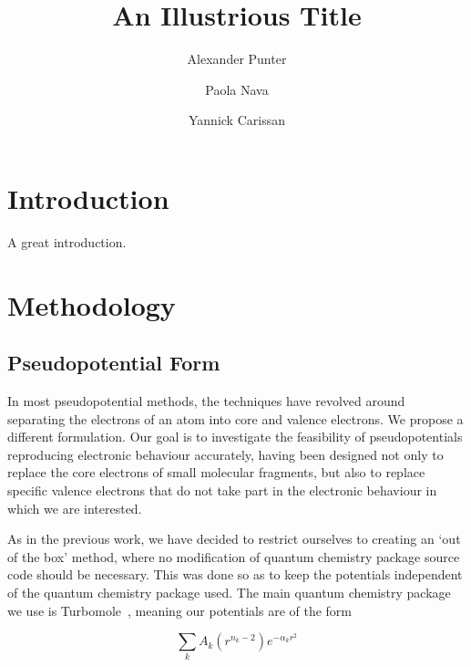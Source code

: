 \documentclass[aip,reprint,nofootinbib]{revtex4-1}
\begin{document}
\title{An Illustrious Title}
\author{Alexander Punter}
\author{Paola Nava}
\author{Yannick Carissan}

\maketitle

\section{Introduction}

A great introduction.

\section{Methodology}

\subsection{Pseudopotential Form}
\label{sec:pseudoform}

In most pseudopotential methods, the techniques have revolved around separating the electrons of an atom into core and valence electrons. We propose a different formulation. Our goal is to investigate the feasibility of pseudopotentials reproducing electronic behaviour accurately, having been designed not only to replace the core electrons of small molecular fragments, but also to replace specific valence electrons that do not take part in the electronic behaviour in which we are interested.

As in the previous work, we have decided to restrict ourselves to creating an `out of the box' method, where no modification of quantum chemistry package source code should be necessary. This was done so as to keep the potentials independent of the quantum chemistry package used. The main quantum chemistry package we use is Turbomole~\cite{TURBOMOLE}, meaning our potentials are of the form

\begin{equation}
\sum_{k}{A_k(r^{n_{k}-2})e^{-\alpha_{k}r^{2}}}
\label{eq:turbomoleecp}
\end{equation}
\end{document}
